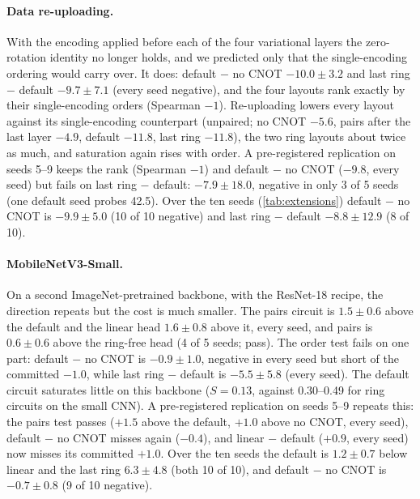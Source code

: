 \paragraph{Data re-uploading.} With the encoding applied before each of the four variational layers the
zero-rotation identity no longer holds, and we predicted only that the single-encoding ordering would
carry over. It does: default $-$ no CNOT $-10.0\pm3.2$ and last ring $-$ default $-9.7\pm7.1$ (every seed
negative), and the four layouts rank exactly by their single-encoding orders (Spearman $-1$). Re-uploading
lowers every layout against its single-encoding counterpart (unpaired; no CNOT $-5.6$, pairs after the
last layer $-4.9$, default $-11.8$, last ring $-11.8$), the two ring layouts about twice as much, and
saturation again rises with order. A pre-registered replication on seeds 5--9 keeps the rank (Spearman $-1$) and default $-$ no CNOT ($-9.8$, every seed) but fails on last ring $-$ default: $-7.9\pm18.0$, negative in only 3 of 5 seeds (one default seed probes 42.5). Over the ten seeds (\cref{tab:extensions}) default $-$ no CNOT is $-9.9\pm5.0$ (10 of 10 negative) and last ring $-$ default $-8.8\pm12.9$ (8 of 10).

\paragraph{MobileNetV3-Small.} On a second ImageNet-pretrained backbone, with the ResNet-18 recipe, the
direction repeats but the cost is much smaller. The pairs circuit is $1.5\pm0.6$ above the default and the linear head $1.6\pm0.8$ above it, every seed, and
pairs is $0.6\pm0.6$ above the ring-free head (4 of 5 seeds; pass).
The order test fails on one part: default $-$ no CNOT is $-0.9\pm1.0$, negative in every seed but short of
the committed $-1.0$, while last ring $-$ default is $-5.5\pm5.8$ (every seed). The default circuit
saturates little on this backbone ($S=0.13$, against 0.30--0.49 for ring circuits on the small CNN).
A pre-registered replication on seeds 5--9 repeats this: the pairs test passes ($+1.5$ above the default, $+1.0$ above no CNOT, every seed), default $-$ no CNOT misses again ($-0.4$), and linear $-$ default ($+0.9$, every seed) now misses its committed $+1.0$. Over the ten seeds the default is $1.2\pm0.7$ below linear and the last ring $6.3\pm4.8$ (both 10 of 10), and default $-$ no CNOT is $-0.7\pm0.8$ (9 of 10 negative).

